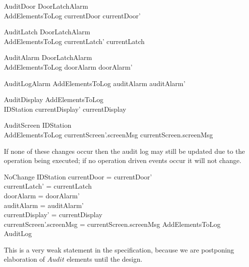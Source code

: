 \begin{lateschema}{AuditDoor}
        \Delta DoorLatchAlarm
\\        AddElementsToLog
\where
        currentDoor \neq currentDoor'
\end{lateschema}

\begin{lateschema}{AuditLatch}
        \Delta DoorLatchAlarm
\\        AddElementsToLog
\where
        currentLatch' \neq currentLatch 
\end{lateschema}

\begin{lateschema}{AuditAlarm}
        \Delta DoorLatchAlarm
\\      AddElementsToLog
\where
        doorAlarm \neq doorAlarm' 
\also
\end{lateschema}

\begin{lateschema}{AuditLogAlarm}
        AddElementsToLog
\where
        auditAlarm \neq auditAlarm'
\end{lateschema}

\begin{lateschema}{AuditDisplay}
        AddElementsToLog
\\      \Delta IDStation 
\where
        currentDisplay' \neq currentDisplay
\end{lateschema}

\begin{lateschema}{AuditScreen}
        \Delta IDStation 
\\      AddElementsToLog
\where
        currentScreen'.screenMsg \neq currentScreen.screenMsg 
\end{lateschema}

If none of these changes occur then the audit log may still be updated due
to the operation being executed; if no operation driven events
occur it will not change.

\begin{lateschema}{NoChange}
      \Delta IDStation
\where
        currentDoor = currentDoor'
\\      currentLatch' = currentLatch 
\\      doorAlarm = doorAlarm' 
\\      auditAlarm = auditAlarm'
\\      currentDisplay' = currentDisplay
\\      currentScreen'.screenMsg = currentScreen.screenMsg 
\also
        AddElementsToLog \lor \Xi AuditLog
\end{lateschema}
\begin{Zcomment}
\item
This is a very weak statement in the specification, because we are
postponing elaboration of $Audit$ elements until the design.
\end{Zcomment}


